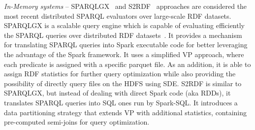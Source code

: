 \textit{In-Memory systems} --
SPARQLGX~\cite{sparqlgx-iswc-2016} and S2RDF~\cite{Schatzle:2016:SRQ:2977797.2977806} approaches are considered the most recent distributed SPARQL evaluators over large-scale RDF datasets.
SPARQLGX is a scalable query engine which is capable of evaluating efficiently the SPARQL queries over distributed RDF datasets~\cite{graux2018multi}.
It provides a mechanism for translating SPARQL queries into Spark executable code for better leveraging the advantage of the Spark framework.
It uses a simplified VP approach, where each predicate is assigned with a specific parquet file.
As an addition, it is able to assign RDF statistics for further query optimization while also providing the possibility of directly query files on the HDFS using SDE.
S2RDF is similar to SPARQLGX, but instead of dealing with direct Spark code (aka RDDs), it translates SPARQL queries into SQL ones run by Spark-SQL.
It introduces a data partitioning strategy that extends VP with additional statistics, containing pre-computed semi-joins for query optimization.




%
%



%

